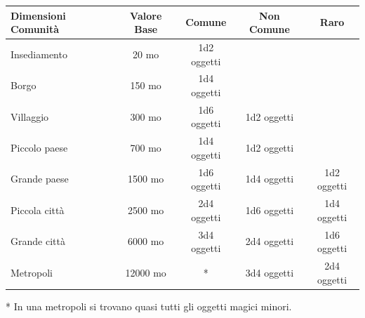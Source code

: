 \bigskip

\begin{tabularx}{0.95\textwidth}{lcccc}
\textbf{Dimensioni Comunità} & \textbf{Valore Base} & \textbf{Comune} & \textbf{Non Comune} & \textbf{Raro}\\
\toprule
Insediamento& 20 mo & 1d2 oggetti && \\
Borgo & 150 mo& 1d4 oggetti && \\
Villaggio & 300 mo& 1d6 oggetti & 1d2 oggetti& \\
Piccolo paese & 700 mo & 1d4 oggetti & 1d2 oggetti& \\
Grande paese& 1500 mo & 1d6 oggetti & 1d4 oggetti& 1d2 oggetti\\
Piccola città & 2500 mo & 2d4 oggetti & 1d6 oggetti& 1d4 oggetti\\
Grande città& 6000 mo & 3d4 oggetti& 2d4 oggetti& 1d6 oggetti\\
Metropoli & 12000 mo& {*} & 3d4 oggetti& 2d4 oggetti
\end{tabularx}

{*} In una metropoli si trovano quasi tutti gli oggetti magici minori.

